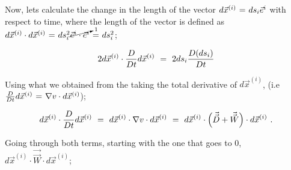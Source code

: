 \documentclass{article}
\begin{document}
Now, lets calculate the change in the length of the vector \begin{math} d \vec{x}^{(i)} \hspace{0.025cm} = \hspace{0.025cm} ds_i \vec{e}^{i} \end{math} with respect to time, where the length of the vector is defined as \begin{math} d \vec{x}^{(i)} \cdot d \vec{x}^{(i)} \hspace{0.025cm} = \hspace{0.025cm} ds_{i}^2 \cancelto{1}{\vec{e}^{i} \cdot \vec{e}^{i}} \hspace{0.025cm} = \hspace{0.025cm} ds_{i}^2 \end{math};

\begin{equation} \label{eb-eq-1-113}
2 d \vec{x}^{(i)} \cdot \frac{D}{D t} d \vec{x}^{(i)} \hspace{0.125cm} = \hspace{0.125cm} 2 ds_i \frac{D ( ds_i )}{D t}
\end{equation} 

Using what we obtained from the taking the total derivative of \begin{math} d \vec{x}^{(i)} \end{math}, (i.e \begin{math} \frac{D}{D t} d \vec{x}^{(i)} \hspace{0.025cm} = \hspace{0.025cm} \nabla{v} \cdot d \vec{x}^{(i)} \end{math}); 

\begin{equation} \label{eb-eq-1-114}
d \vec{x}^{(i)} \cdot \frac{D}{D t} d \vec{x}^{(i)} \hspace{0.125cm} = \hspace{0.125cm} d \vec{x}^{(i)} \cdot  \nabla{v} \cdot d \vec{x}^{(i)} \hspace{0.125cm} = \hspace{0.125cm} d \vec{x}^{(i)} \cdot \Big( \vec{\vec{D}} + \vec{\vec{W}} \Big) \cdot d \vec{x}^{(i)} \hspace{0.125cm} . 
\end{equation} 

Going through both terms, starting with the one that goes to 0, \begin{math} d \vec{x}^{(i)} \cdot \vec{\vec{W}} \cdot d \vec{x}^{(i)} \end{math};
\end{document}
